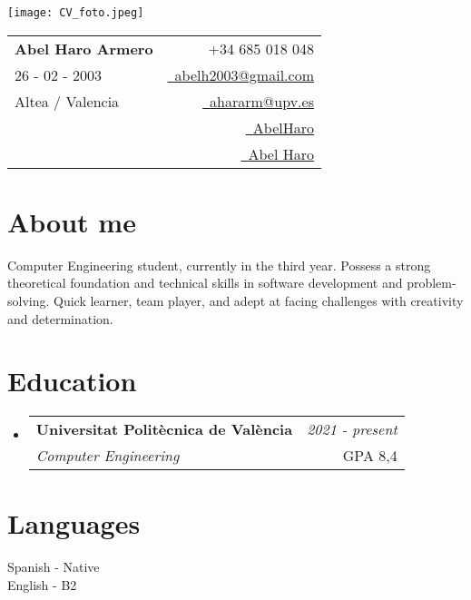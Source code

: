 \documentclass[a4paper,11pt]{article}
\makeatletter
\newcommand{\resumeSubheading}[4]{
\vspace{0.5mm}\item
    \begin{tabular*}{0.98\textwidth}[t]{l@{\extracolsep{\fill}}r}
        \textbf{#1} & \textit{\footnotesize{#4}} \\
        \textit{\footnotesize{#3}} &  \footnotesize{#2}\\
    \end{tabular*}
    \vspace{-2.4mm}
}
\newcommand{\resumeSubHeadingListStart}{\begin{itemize}[leftmargin=*,labelsep=0mm]}
\newcommand{\resumeSubHeadingListEnd}{\end{itemize}\vspace{2mm}}
\newcommand{\name}{Abel Haro Armero} %
\newcommand{\course}{Altea / Valencia} %
\newcommand{\phone}{685 018 048} %
\newcommand{\emaila}{abelh2003@gmail.com} %
\newcommand{\emailb}{ahararm@upv.es} %
\newcommand{\cvdate}{26 - 02 - 2003} %
\makeatother
\begin{document}
\selectfont


\parbox{2.6cm}{%
\texttt{[image: CV\_foto.jpeg]}
}
\parbox{\dimexpr\linewidth-2.9cm\relax}{
\begin{tabularx}{\linewidth}{L r}
  \textbf{\Large \name} & {\raisebox{0.0\height}{\footnotesize \faPhone}\ +34 \phone} \\
  \cvdate & \href{mailto:\emaila}{\raisebox{0.0\height}{\footnotesize \faEnvelope}\ {\emaila}} \\
  \course & \href{mailto:\emailb}{\raisebox{0.0\height}{\footnotesize \faEnvelope}\ {\emailb}} \\
  {} & \href{https://github.com/AbelHaro}{\raisebox{0.0\height}{\footnotesize \faGithub}\ {AbelHaro}} \\
  {} & \href{https://www.linkedin.com/in/abel-haro-54bb6518a}{\raisebox{0.0\height}{\footnotesize \faLinkedin}\ {Abel Haro}}
\end{tabularx}
}


\section{\textbf{About me}}
\vspace{0.1cm}
  Computer Engineering student, currently in the third year. Possess a strong theoretical foundation
and technical skills in software development and problem-
solving. Quick learner, team player, and adept at facing
challenges with creativity and determination.
\vspace{-5.5mm}
\vspace{0.3cm}
%





\section{\textbf{Education}}
  \resumeSubHeadingListStart
    \resumeSubheading
      {Universitat Politècnica de València}{GPA 8,4}
      {Computer Engineering}{2021 - present}
  \resumeSubHeadingListEnd
\vspace{-5.5mm}



\section{\textbf{Languages}}
\begin{itemize}[leftmargin=0.1in, label={}]
    \small{\item{
     Spanish - Native \\
     English - B2
    }}
 \end{itemize}
 \vspace{-16pt}
\end{document}
